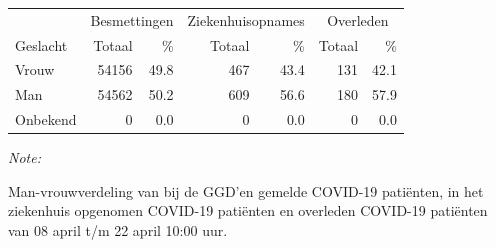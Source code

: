 \documentclass[
  english,
  man,floatsintext]{apa6}
\begin{document}
\begin{table}
\centering\begingroup\fontsize{11}{13}\selectfont

\begin{threeparttable}
\begin{tabular}{lrrrrrr}
\toprule
\multicolumn{1}{c}{ } & \multicolumn{2}{c}{Besmettingen} & \multicolumn{2}{c}{Ziekenhuisopnames} & \multicolumn{2}{c}{Overleden} \\
\cmidrule(l{3pt}r{3pt}){2-3} \cmidrule(l{3pt}r{3pt}){4-5} \cmidrule(l{3pt}r{3pt}){6-7}
Geslacht & Totaal & \% & Totaal & \% & Totaal & \%\\
\midrule
Vrouw & 54156 & 49.8 & 467 & 43.4 & 131 & 42.1\\
Man & 54562 & 50.2 & 609 & 56.6 & 180 & 57.9\\
Onbekend & 0 & 0.0 & 0 & 0.0 & 0 & 0.0\\
\bottomrule
\end{tabular}
\begin{tablenotes}
\item \textit{Note: } 
\item Man-vrouwverdeling van bij de GGD’en gemelde COVID-19 patiënten, in het ziekenhuis opgenomen COVID-19 patiënten en overleden COVID-19 patiënten van 08 april t/m 22 april 10:00 uur.
\end{tablenotes}
\end{threeparttable}
\endgroup{}
\end{table}
\newpage
\end{document}
